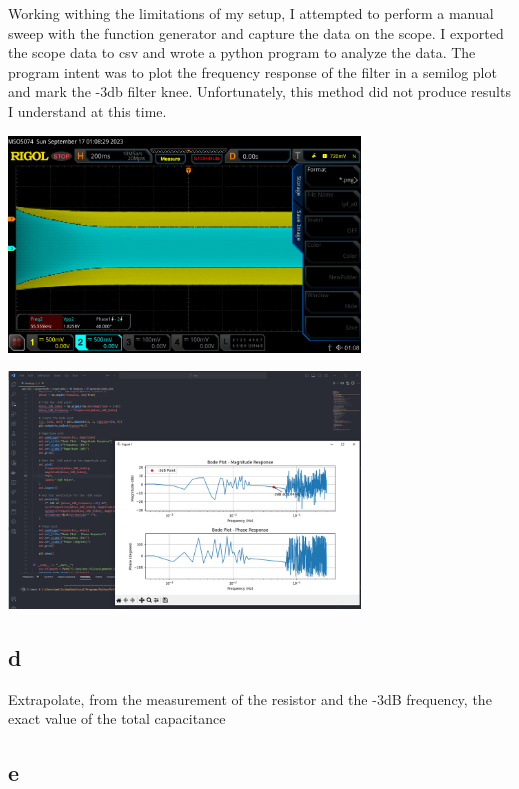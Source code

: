 \documentclass{article}
\begin{document}
	Working withing the limitations of my setup, I attempted to perform a manual sweep with the function generator and capture the data on the scope. 
	I exported the scope data to csv and wrote a python program to analyze the data. The program intent was to plot the frequency response of the filter
	in a semilog plot and mark the -3db filter knee. Unfortunately, this method did not produce results I understand at this time.

	
	\begin{center}
	\includegraphics[width=0.7\textwidth]{lpf_manual-sweep}
	\end{center}

	\begin{center}
	\includegraphics[width=0.7\textwidth]{bode-py}
	\end{center}
	
	
	\subsection*{d}
	
	Extrapolate, from the measurement of the resistor and the -3dB frequency, the exact value of the total capacitance
	
	\subsection*{e}
	
\end{document}
